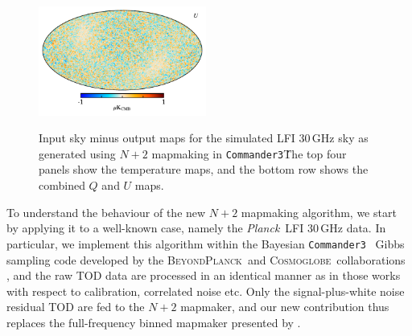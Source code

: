 \documentclass{aa}
\def\commanderthree{\texttt{Commander3}}
\newcommand{\BP}{\textsc{BeyondPlanck}}
\newcommand{\cosmoglobe}{\textsc{Cosmoglobe}}
\def\Planck{\textit{Planck}}
\begin{document}
\begin{figure}
  \includegraphics[width=0.49\textwidth]{figs/sim_diff_U.pdf}\\
  \caption{Input sky minus output maps for the simulated LFI 30\,GHz sky as generated using $N+2$ mapmaking in \commanderthree\. The top four panels show the temperature maps, and the bottom row shows the combined $Q$ and $U$ maps.}
  \label{fig:sim_diff}
\end{figure}








To understand the behaviour of the new $N+2$ mapmaking algorithm, we start by applying it to a well-known case, namely the \Planck\ LFI 30\,GHz data. In particular, we implement this algorithm within the Bayesian \commanderthree\ \citep{bp03} Gibbs sampling code developed by the \BP\ and \cosmoglobe\ collaborations \citep{bp01, watts2023_dr1}, and the raw TOD data are processed in an identical manner as in those works with respect to calibration, correlated noise etc. Only the signal-plus-white noise residual TOD are fed to the $N+2$ mapmaker, and our new contribution thus replaces the full-frequency binned mapmaker presented by \citet{BP10}. 
\end{document}
